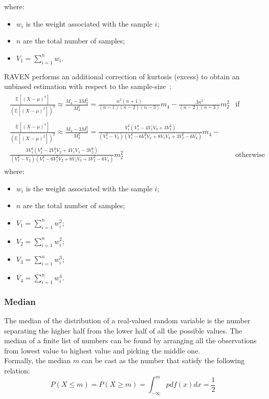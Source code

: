where:
\begin{itemize}
  \item $w_{i}$ is the weight associated with the sample $i$;
  \item $n$ are the total number of samples;
  \item $V_{1} = \sum_{i=1}^{n} w_{i}$.
\end{itemize}
RAVEN performs an additional correction of kurtosis (excess) to obtain an unbiased estimation  with respect to the sample-size~\cite{RimoldiniUnbiased}:
\begin{equation}
\begin{split}
\begin{matrix}
\frac{ \mathbb{E}\left [ \left ( X-\mu \right )^{4} \right ]}{\left ( \mathbb{E}\left [ \left ( X-\mu \right )^{2} \right ] \right )^{2}}   \approx \frac{M_{4}-3M_{2}^{2}}{M_{2}^{2}}  = \displaystyle \frac{n^{2}(n+1)}{(n-1)(n-2)(n-3)}m_{4}-\frac{3n^{2}}{(n-2)(n-3)}m_{2}^{2} & \text{if random sampling}  
\\
\\
\frac{ \mathbb{E}\left [ \left ( X-\mu \right )^{4} \right ]}{\left ( \mathbb{E}\left [ \left ( X-\mu \right )^{2} \right ] \right )^{2}}    \approx \frac{M_{4}-3M_{2}^{2}}{M_{2}^{2}}  = \displaystyle  \frac{V_{1}^{2}(V_{1}^{4}-4V_{1}V_{3}+3V_{2}^{2})}{(V_{1}^{2}-V_{2})(V_{1}^{4}-6V_{1}^{2}V_{2}+8V_{1}V_{3}+3V_{2}^{2}-6V_{4})}m_{4}
- \\
\displaystyle \frac{3V_{1}^{2}(V_{1}^{4}-2V_{1}^{2}V_{2}+4V_{1}V_{3}-3V_{2}^{2})}{(V_{1}^{2}-V_{2})(V_{1}^{4}-6V_{1}^{2}V_{2}+8V_{1}V_{3}+3V_{2}^{2}-6V_{4})}m_{2}^{2} & \text{otherwise}
\end{matrix}
\end{split}
\end{equation}
where:
\begin{itemize}
  \item $w_{i}$ is the weight associated with the sample $i$;
  \item $n$ are the total number of samples;
  \item $V_{1} = \sum_{i=1}^{n} w_{i}^{2}$;
  \item $V_{2} = \sum_{i=1}^{n} w_{i}^{2}$;
  \item $V_{3} = \sum_{i=1}^{n} w_{i}^{3}$;
  \item $V_{4} = \sum_{i=1}^{n} w_{i}^{4}$.
\end{itemize}

\subsubsection{Median}
The median of the distribution of a real-valued random variable is the number separating the higher half from the lower half of all
the possible values. The median of a finite list of numbers can be found by arranging all the observations from lowest value to highest value and picking the middle one.
\\Formally, the median $m$ can be cast as the number that satisfy the following relation:
\begin{equation}
  P(X\leq m) = P(X \geq m) = \int_{-\infty}^{m} pdf(x) dx=\frac{1}{2}
\end{equation}


